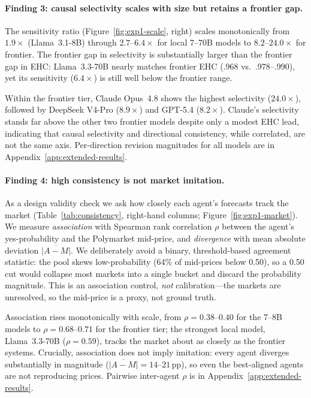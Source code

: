 \paragraph{Finding 3: causal selectivity scales with size but retains a frontier gap.}
The sensitivity ratio (Figure~\ref{fig:exp1-scale}, right) scales monotonically from
$1.9\times$ (Llama~3.1-8B) through $2.7$--$6.4\times$ for local 7--70B models to
$8.2$--$24.0\times$ for frontier.  The frontier gap in selectivity is substantially larger
than the frontier gap in EHC: Llama~3.3-70B nearly matches frontier EHC (.968 vs.\
.978--.990), yet its sensitivity ($6.4\times$) is still well below the frontier range.

Within the frontier tier, Claude Opus~4.8 shows the highest selectivity ($24.0\times$),
followed by DeepSeek V4-Pro ($8.9\times$) and GPT-5.4 ($8.2\times$).  Claude's selectivity
stands far above the other two frontier models despite only a modest EHC lead, indicating
that causal selectivity and directional consistency, while correlated, are not the same
axis.  Per-direction revision magnitudes for all models are in
Appendix~\ref{app:extended-results}.

\paragraph{Finding 4: high consistency is not market imitation.}
As a design validity check we ask how closely each agent's forecasts track the market
(Table~\ref{tab:consistency}, right-hand columns; Figure~\ref{fig:exp1-market}).  We
measure \emph{association} with Spearman rank
correlation $\rho$ between the agent's yes-probability and the Polymarket mid-price, and
\emph{divergence} with mean absolute deviation $\overline{|A{-}M|}$.  We deliberately
avoid a binary, threshold-based agreement statistic: the pool skews low-probability
(64\% of mid-prices below 0.50), so a 0.50 cut would collapse most markets into a single
bucket and discard the probability magnitude.  This is an association control, \emph{not}
calibration---the markets are unresolved, so the mid-price is a proxy, not ground truth.

Association rises monotonically with scale, from $\rho = 0.38$--$0.40$ for the 7--8B
models to $\rho = 0.68$--$0.71$ for the frontier tier; the strongest local model,
Llama~3.3-70B ($\rho = 0.59$), tracks the market about as closely as the frontier
systems.  Crucially, association does not imply imitation: every agent diverges
substantially in magnitude ($\overline{|A{-}M|} = 14$--$21$\,pp), so even the
best-aligned agents are not reproducing prices.  Pairwise inter-agent $\rho$ is in
Appendix~\ref{app:extended-results}.

